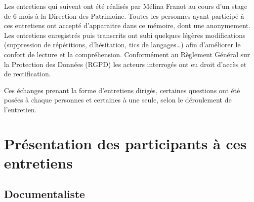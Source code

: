Les entretiens qui suivent ont été réalisés par Mélina Franot au cours d’un stage de 6 mois à la Direction des Patrimoine. Toutes les personnes ayant participé à ces entretiens ont accepté d’apparaitre dans ce mémoire, dont une anonymement. Les entretiens enregistrés puis transcrits ont subi quelques légères modifications (suppression de répétitions, d’hésitation, tics de langages…) afin d’améliorer le confort de lecture et la compréhension. Conformément au Règlement Général sur la Protection des Données (RGPD) les acteurs interrogés ont eu droit d’accès et de rectification.\newline

Ces échanges prenant la forme d’entretiens dirigés, certaines questions ont été posées à chaque personnes et certaines à une seule, selon le déroulement de l’entretien.

\section*{Présentation des participants à ces entretiens}

\subsection*{Documentaliste}  


